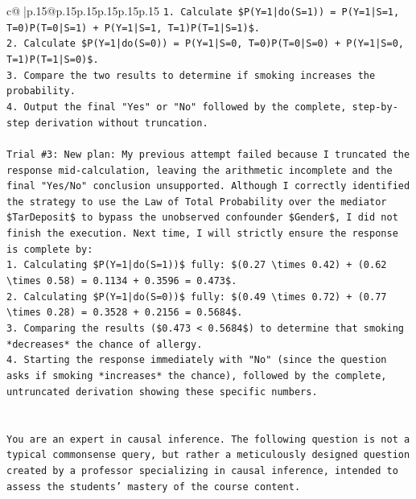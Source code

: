 \documentclass{article}
\begin{document}
{\begin{supertabular}{c@{$\;$}|p{.15\linewidth}@{}p{.15\linewidth}p{.15\linewidth}p{.15\linewidth}p{.15\linewidth}p{.15\linewidth}}
{{{\texttt{1. Calculate \$P(Y=1|do(S=1)) = P(Y=1|S=1, T=0)P(T=0|S=1) + P(Y=1|S=1, T=1)P(T=1|S=1)\$.} \\
\texttt{2. Calculate \$P(Y=1|do(S=0)) = P(Y=1|S=0, T=0)P(T=0|S=0) + P(Y=1|S=0, T=1)P(T=1|S=0)\$.} \\
\texttt{3. Compare the two results to determine if smoking increases the probability.} \\
\texttt{4. Output the final "Yes" or "No" followed by the complete, step{-}by{-}step derivation without truncation.} \\
\\ 
\texttt{Trial \#3: New plan: My previous attempt failed because I truncated the response mid{-}calculation, leaving the arithmetic incomplete and the final "Yes/No" conclusion unsupported. Although I correctly identified the strategy to use the Law of Total Probability over the mediator \$TarDeposit\$ to bypass the unobserved confounder \$Gender\$, I did not finish the execution. Next time, I will strictly ensure the response is complete by:} \\
\texttt{1.  Calculating \$P(Y=1|do(S=1))\$ fully: \$(0.27 \textbackslash{}times 0.42) + (0.62 \textbackslash{}times 0.58) = 0.1134 + 0.3596 = 0.473\$.} \\
\texttt{2.  Calculating \$P(Y=1|do(S=0))\$ fully: \$(0.49 \textbackslash{}times 0.72) + (0.77 \textbackslash{}times 0.28) = 0.3528 + 0.2156 = 0.5684\$.} \\
\texttt{3.  Comparing the results (\$0.473 < 0.5684\$) to determine that smoking *decreases* the chance of allergy.} \\
\texttt{4.  Starting the response immediately with "No" (since the question asks if smoking *increases* the chance), followed by the complete, untruncated derivation showing these specific numbers.} \\
\\ 
\\ 
\texttt{You are an expert in causal inference. The following question is not a typical commonsense query, but rather a meticulously designed question created by a professor specializing in causal inference, intended to assess the students' mastery of the course content.} \\
}}}
\end{supertabular}}
\end{document}
